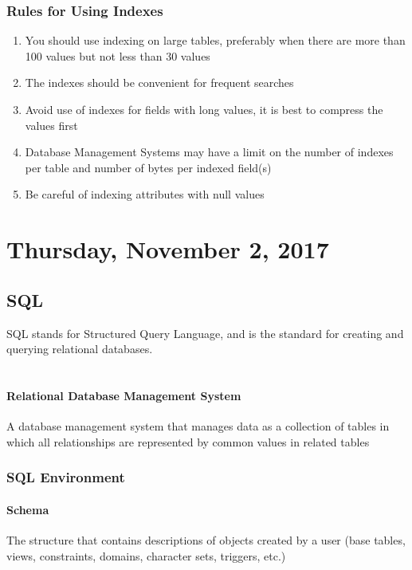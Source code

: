 \documentclass[12pt]{article}
\begin{document}
\subsubsection{Rules for Using Indexes}
\begin{enumerate}
	\item{You should use indexing on large tables, preferably when there are more than 100 values but not less than 30 values}
	\item{The indexes should be convenient for frequent searches}
	\item{Avoid use of indexes for fields with long values, it is best to compress the values first}
	\item{Database Management Systems may have a limit on the number of indexes per table and number of bytes per indexed field(s)}
	\item{Be careful of indexing attributes with null values}
\end{enumerate}

\newpage

\section{Thursday, November 2, 2017}

\subsection{SQL}

SQL stands for Structured Query Language, and is the standard for creating and querying relational databases.\\
\\
\paragraph{Relational Database Management System} A database management system that manages data as a collection of tables in which all relationships are represented by common values in related tables

\subsubsection{SQL Environment}

\paragraph{Schema} The structure that contains descriptions of objects created by a user (base tables, views, constraints, domains, character sets, triggers, etc.)
\end{document}
